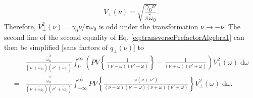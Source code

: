 \documentclass{article}
\begin{document}
\begin{equation}
V_\perp(\nu) = \sqrt{\frac{\gamma_0\nu}{\pi\tilde{\omega}_0}}.
\end{equation}
Therefore, $V_\perp^2(\nu) = \gamma_0\nu/\pi\tilde{\omega}_0$ is odd under the transformation $\nu\to-\nu$. The second line of the second equality of Eq. \eqref{eq:transversePrefactorAlgebra1} can then be simplified [sans factors of $q_\perp(\nu)$] to
\begin{equation}
\begin{split}
&\frac{\tilde{\omega}_0^2}{(\nu + \tilde{\omega}_0)(\nu' + \tilde{\omega}_0)}\int_0^\infty\left(PV\left\{\frac{1}{(\nu - \omega)(\nu' - \omega)}\right\} - \frac{1}{(\nu + \omega)(\nu' + \omega)}\right)V_\perp^2(\omega)\;\mathrm{d}\omega\\
=& \frac{\tilde{\omega}_0^2}{(\nu + \tilde{\omega}_0)(\nu' + \tilde{\omega}_0)}\int_{-\infty}^\infty PV\left\{\frac{\omega(\nu + \nu')}{(\nu - \omega)(\nu' - \omega)(\nu + \omega)(\nu' + \omega)}\right\}V_\perp^2(\omega)\;\mathrm{d}\omega.
\end{split}
\end{equation}
\end{document}
